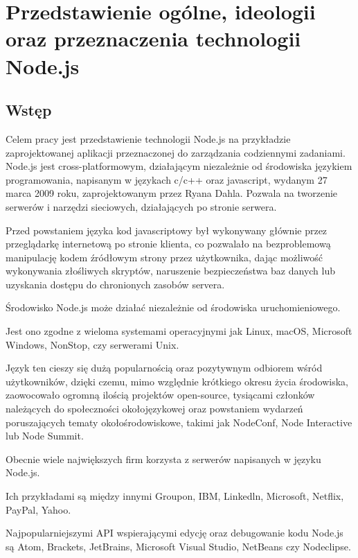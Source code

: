 \documentclass[12pt]{report}
\begin{document}
\tableofcontents

\chapter{Przedstawienie ogólne, ideologii oraz przeznaczenia technologii Node.js}

\section{Wstęp}
Celem pracy jest przedstawienie technologii Node.js na przykładzie zaprojektowanej aplikacji przeznaczonej do zarządzania codziennymi zadaniami.
Node.js jest cross-platformowym, działającym niezależnie od środowiska językiem programowania, napisanym w językach c/c++ oraz javascript, wydanym 27 marca 2009 roku, zaprojektowanym przez Ryana Dahla.
Pozwala na tworzenie serwerów i narzędzi sieciowych, działających po stronie serwera.

Przed powstaniem języka kod javascriptowy był wykonywany głównie przez przeglądarkę internetową po stronie klienta, co pozwalało na bezproblemową manipulację kodem źródłowym strony przez użytkownika, dając możliwość wykonywania złośliwych skryptów, naruszenie bezpieczeństwa baz danych lub uzyskania dostępu do chronionych zasobów servera.

Środowisko Node.js może działać niezależnie od środowiska uruchomieniowego.

Jest ono zgodne z wieloma systemami operacyjnymi jak  Linux, macOS, Microsoft Windows, NonStop, czy serwerami Unix.

Język ten cieszy się dużą popularnością oraz pozytywnym odbiorem wśród użytkowników, dzięki czemu, mimo względnie krótkiego okresu życia środowiska, zaowocowało ogromną ilością projektów open-source, tysiącami członków należących do społeczności okołojęzykowej oraz powstaniem wydarzeń poruszających tematy okołośrodowiskowe, takimi jak NodeConf, Node Interactive lub Node Summit.

Obecnie wiele największych firm korzysta z serwerów napisanych w języku Node.js.

Ich przykładami są między innymi Groupon, IBM, Linkedln, Microsoft, Netflix, PayPal, Yahoo.

Najpopularniejszymi API wspierającymi edycję oraz debugowanie kodu Node.js są Atom, Brackets, JetBrains, Microsoft Visual Studio, NetBeans czy Nodeclipse.
\end{document}
